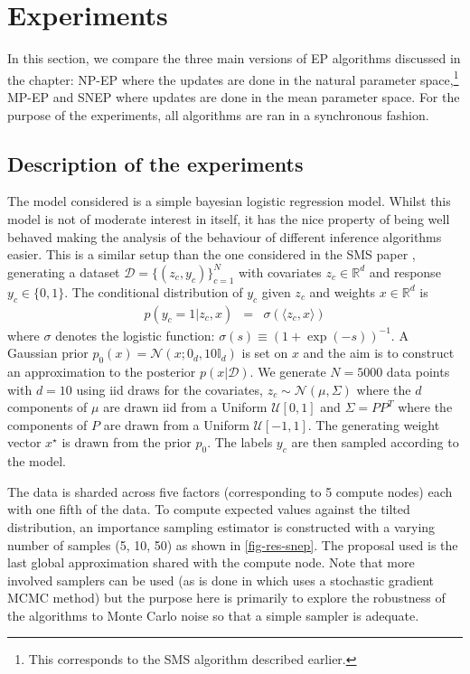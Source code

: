 \section{\label{dist-ep-exps}Experiments}

In this section, we compare the three main versions of EP algorithms discussed in the chapter: NP-EP where the updates are done in the natural parameter space,\footnote{This corresponds to the SMS algorithm described earlier.} MP-EP and SNEP where updates are done in the mean parameter space. For the purpose of the experiments, all algorithms are ran in a synchronous fashion. 

\subsection{Description of the experiments}

The model considered is a simple bayesian logistic regression model. Whilst this model is not of moderate interest in itself, it has the nice property of being well behaved making the analysis of the behaviour of different inference algorithms easier. This is a similar setup than the one considered in the SMS paper \citep{xu14}, generating a dataset $\mathcal D=\{(z_c, y_c)\}_{c=1}^N$ with covariates $z_c\in\mathbb R^d$ and response $y_c\in\{0,1\}$. The conditional distribution of $y_c$ given $z_c$ and weights $x\in\mathbb R^d$  is 
\begin{eqnarray}
    p(y_c=1|z_c, x) &=& \sigma(\langle z_c, x\rangle )
\end{eqnarray}
where $\sigma$ denotes the logistic function: $\sigma(s)\equiv (1+\exp(-s))^{-1}$. A Gaussian prior $p_0(x) = \mathcal N(x; 0_d, 10\mathbb I_d)$ is set on $x$ and the aim is to construct an approximation to the posterior $p(x|\mathcal D)$. We generate $N=5000$ data points with $d=10$ using iid draws for the covariates, $z_c\sim\mathcal N(\mu, \Sigma)$ where the $d$ components of $\mu$ are drawn iid from a Uniform $\mathcal U[0,1]$ and $\Sigma=PP^T$ where the components of $P$ are drawn from a Uniform $\mathcal U[-1,1]$. The generating weight vector $x^\star$ is drawn from the prior $p_0$. The labels $y_c$ are then sampled according to the model.

The data is sharded across five factors (corresponding to 5 compute nodes) each with one fifth of the data. To compute expected values against the tilted distribution, an importance sampling estimator is constructed with a varying number of samples (5, 10, 50) as shown in \ref{fig-res-snep}. The proposal used is the last global approximation shared with the compute node. Note that more involved samplers can be used (as is done in \citet{hasenclever16} which uses a stochastic gradient MCMC method) but the purpose here is primarily to explore the robustness of the algorithms to Monte Carlo noise so that a simple sampler is adequate. 

